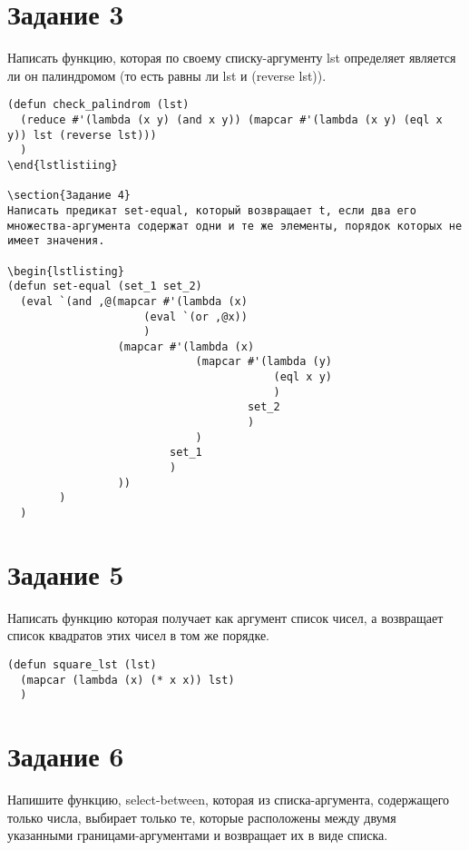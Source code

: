 \section{Задание 3}
Написать функцию, которая по своему списку-аргументу lst определяет является ли он палиндромом (то есть равны ли lst и (reverse lst)).

\begin{lstlisting}
(defun check_palindrom (lst)
  (reduce #'(lambda (x y) (and x y)) (mapcar #'(lambda (x y) (eql x y)) lst (reverse lst)))
  )
\end{lstlistiing}

\section{Задание 4}
Написать предикат set-equal, который возвращает t, если два его множества-аргумента содержат одни и те же элементы, порядок которых не имеет значения.

\begin{lstlisting}
(defun set-equal (set_1 set_2)
  (eval `(and ,@(mapcar #'(lambda (x)
                     (eval `(or ,@x))
                     )
                 (mapcar #'(lambda (x)
                             (mapcar #'(lambda (y)
                                         (eql x y)
                                         )
                                     set_2
                                     )
                             )
                         set_1
                         )
                 ))
        )
  )
\end{lstlisting}

\section{Задание 5}
Написать функцию которая получает как аргумент список чисел, а возвращает список квадратов этих чисел в том же порядке.

\begin{lstlisting}
(defun square_lst (lst)
  (mapcar (lambda (x) (* x x)) lst)
  )
\end{lstlisting}

\section{Задание 6}
Напишите функцию, select-between, которая из списка-аргумента, содержащего только числа, выбирает только те, которые расположены между двумя указанными границами-аргументами и возвращает их в виде списка.

